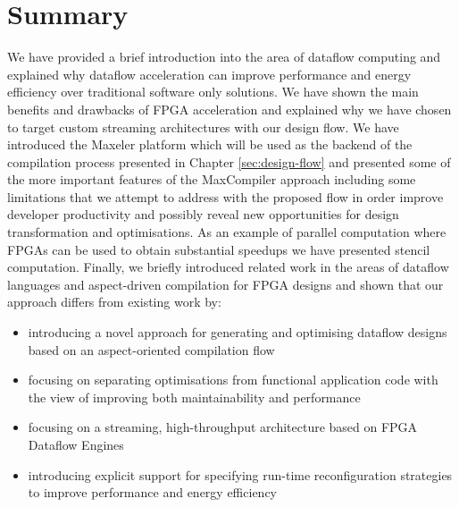 \section{Summary}

We have provided a brief introduction into the area of dataflow
computing and explained why dataflow acceleration can improve
performance and energy efficiency over traditional software only
solutions. We have shown the main benefits and drawbacks of FPGA
acceleration and explained why we have chosen to target custom
streaming architectures with our design flow. We have introduced the
Maxeler platform which will be used as the backend of the compilation
process presented in Chapter \ref{sec:design-flow} and presented some
of the more important features of the MaxCompiler approach including
some limitations that we attempt to address with the proposed flow in
order improve developer productivity and possibly reveal new
opportunities for design transformation and optimisations. As an
example of parallel computation where FPGAs can be used to obtain
substantial speedups we have presented stencil computation. Finally,
we briefly introduced related work in the areas of dataflow languages
and aspect-driven compilation for FPGA designs and shown that our
approach differs from existing work by:

\begin{itemize}
\item introducing a novel approach for generating and optimising
  dataflow designs based on an aspect-oriented compilation flow
\item focusing on separating optimisations from functional application
  code with the view of improving both maintainability and performance
\item focusing on a streaming, high-throughput architecture based on
  FPGA Dataflow Engines
\item introducing explicit support for specifying run-time
  reconfiguration strategies to improve performance and energy
  efficiency
\end{itemize}